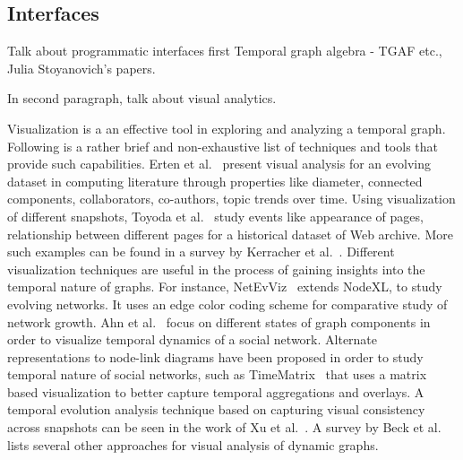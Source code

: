 \documentclass{svjour3}
\begin{document}
\vspace{2mm}



\subsection{Interfaces}
Talk about programmatic interfaces first Temporal graph algebra - TGAF etc., Julia Stoyanovich's papers. 

In second paragraph, talk about visual analytics.

Visualization is a an effective tool in exploring and analyzing a temporal graph. Following is a rather brief and non-exhaustive list of techniques and tools that provide such capabilities. 
Erten et al.~\cite{erten2004exploring} present visual analysis for an evolving dataset in computing literature through properties like diameter, connected components, collaborators, co-authors, topic trends over time.
Using visualization of different snapshots, Toyoda et al.~\cite{toyoda2005system} study events like appearance of pages, relationship between different pages for a historical dataset of Web archive.
More such examples can be found in a survey by Kerracher et al.~\cite{kerracher2015task}. Different visualization techniques are useful in the process of gaining insights into the temporal nature of graphs. For instance, NetEvViz~\cite{khurana2011visual} extends NodeXL, to study evolving networks. It uses an edge color coding scheme for comparative study of network growth. Ahn et al.~\cite{ahn2011temporal} focus on different states of graph components in order to visualize temporal dynamics of a social network.
Alternate representations to node-link diagrams have been proposed in order to study temporal nature of social networks, such as TimeMatrix~\cite{yi2010timematrix} that uses a matrix based visualization to better capture temporal aggregations and overlays. A temporal evolution analysis technique based on capturing visual consistency across snapshots can be seen in the work of Xu et al.~\cite{xu2011visualizing}.
A survey by Beck et al.~\cite{beck2014state} lists several other approaches for visual analysis of dynamic graphs. 





\end{document}
